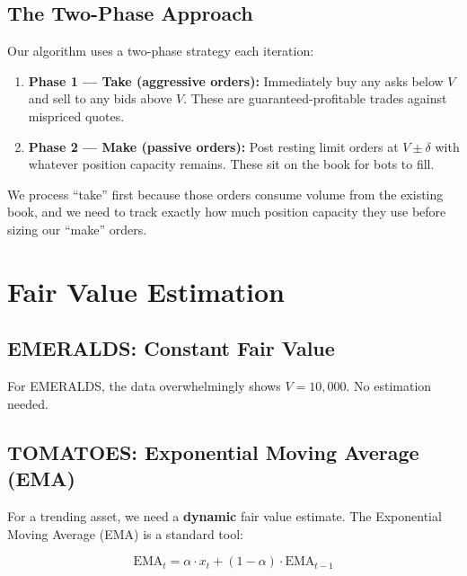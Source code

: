 \documentclass[11pt, letterpaper]{article}
\begin{document}
\subsection{The Two-Phase Approach}

Our algorithm uses a two-phase strategy each iteration:

\begin{enumerate}
    \item \textbf{Phase 1 --- Take (aggressive orders):} Immediately buy any asks below $V$ and sell to any bids above $V$. These are guaranteed-profitable trades against mispriced quotes.

    \item \textbf{Phase 2 --- Make (passive orders):} Post resting limit orders at $V \pm \delta$ with whatever position capacity remains. These sit on the book for bots to fill.
\end{enumerate}

We process ``take'' first because those orders consume volume from the existing book, and we need to track exactly how much position capacity they use before sizing our ``make'' orders.


\section{Fair Value Estimation}

\subsection{EMERALDS: Constant Fair Value}

For EMERALDS, the data overwhelmingly shows $V = 10{,}000$. No estimation needed.

\subsection{TOMATOES: Exponential Moving Average (EMA)}

For a trending asset, we need a \textbf{dynamic} fair value estimate. The Exponential Moving Average (EMA) is a standard tool:

\begin{equation}
    \text{EMA}_t = \alpha \cdot x_t + (1 - \alpha) \cdot \text{EMA}_{t-1}
    \label{eq:ema}
\end{equation}
\end{document}
